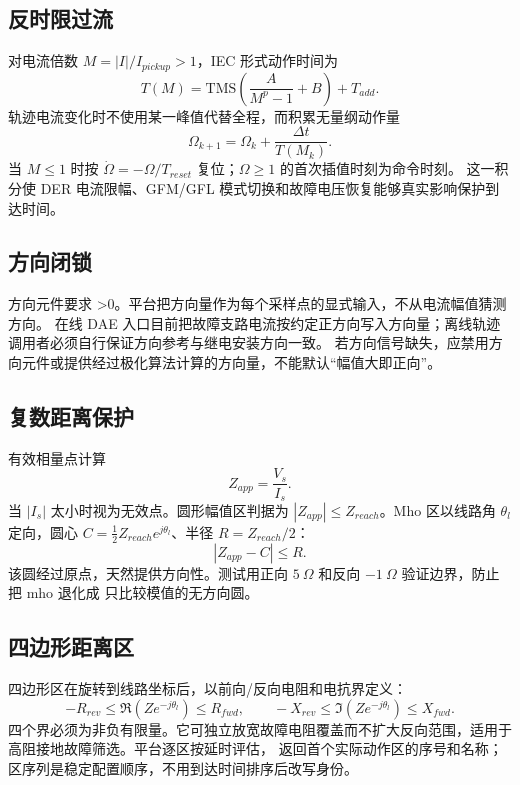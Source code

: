 \subsection{反时限过流}
对电流倍数 $M=|I|/I_{pickup}>1$，IEC 形式动作时间为
\begin{equation}
 T(M)=\mathrm{TMS}\left(\frac{A}{M^p-1}+B\right)+T_{add}.
\end{equation}
轨迹电流变化时不使用某一峰值代替全程，而积累无量纲动作量
\begin{equation}
 \Omega_{k+1}=\Omega_k+\frac{\Delta t}{T(M_k)}.
\end{equation}
当 $M\le1$ 时按 $\dot\Omega=-\Omega/T_{reset}$ 复位；$\Omega\ge1$ 的首次插值时刻为命令时刻。
这一积分使 DER 电流限幅、GFM/GFL 模式切换和故障电压恢复能够真实影响保护到达时间。

\subsection{方向闭锁}
方向元件要求 >0。平台把方向量作为每个采样点的显式输入，不从电流幅值猜测方向。
在线 DAE 入口目前把故障支路电流按约定正方向写入方向量；离线轨迹调用者必须自行保证方向参考与继电安装方向一致。
若方向信号缺失，应禁用方向元件或提供经过极化算法计算的方向量，不能默认“幅值大即正向”。

\subsection{复数距离保护}
有效相量点计算
\begin{equation}
 Z_{app}=\frac{V_s}{I_s}.
\end{equation}
当 $|I_s|$ 太小时视为无效点。圆形幅值区判据为 $|Z_{app}|\le Z_{reach}$。Mho 区以线路角
$\theta_l$ 定向，圆心 $C=\tfrac12 Z_{reach}e^{j\theta_l}$、半径 $R=Z_{reach}/2$：
\begin{equation}
 |Z_{app}-C|\le R.
\end{equation}
该圆经过原点，天然提供方向性。测试用正向 $5\ \Omega$ 和反向 $-1\ \Omega$ 验证边界，防止把 mho 退化成
只比较模值的无方向圆。

\subsection{四边形距离区}
四边形区在旋转到线路坐标后，以前向/反向电阻和电抗界定义：
\begin{equation}
 -R_{rev}\le \Re(Ze^{-j\theta_l})\le R_{fwd},\qquad
 -X_{rev}\le \Im(Ze^{-j\theta_l})\le X_{fwd}.
\end{equation}
四个界必须为非负有限量。它可独立放宽故障电阻覆盖而不扩大反向范围，适用于高阻接地故障筛选。平台逐区按延时评估，
返回首个实际动作区的序号和名称；区序列是稳定配置顺序，不用到达时间排序后改写身份。

